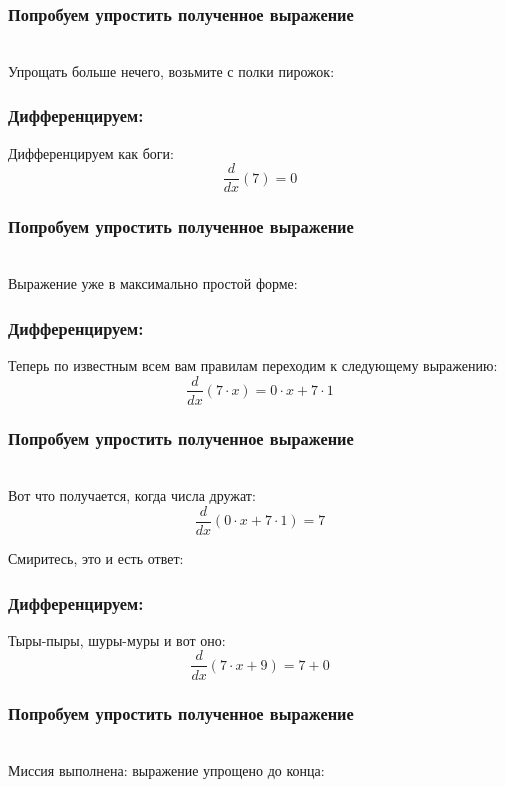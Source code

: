 \documentclass[a4paper,12pt]{article}
\begin{document}
\subsubsection*{Попробуем упростить полученное выражение}
\\Упрощать больше нечего, возьмите с полки пирожок:

\subsubsection*{Дифференцируем:}

Дифференцируем как боги:
\begin{dmath}\frac{d}{dx}\left(7\right)=0\end{dmath}
\subsubsection*{Попробуем упростить полученное выражение}
\\Выражение уже в максимально простой форме:

\subsubsection*{Дифференцируем:}

Теперь по известным всем вам правилам переходим к следующему выражению:
\begin{dmath}\frac{d}{dx}\left(7\cdot x\right)=0\cdot x+ 7\cdot 1\end{dmath}
\subsubsection*{Попробуем упростить полученное выражение}
\\Вот что получается, когда числа дружат:\\
\begin{dmath}
	\frac{d}{dx}\left(0\cdot x+ 7\cdot 1\right) = 7\end{dmath}

Смиритесь, это и есть ответ:

\subsubsection*{Дифференцируем:}

Тыры-пыры, шуры-муры и вот оно:
\begin{dmath}\frac{d}{dx}\left(7\cdot x+ 9\right)=7+ 0\end{dmath}
\subsubsection*{Попробуем упростить полученное выражение}
\\Миссия выполнена: выражение упрощено до конца:
\end{document}
